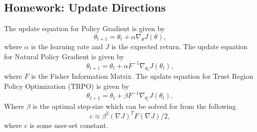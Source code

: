 \documentclass{article}
\begin{document}
\subsection{Homework: Update Directions}
The update equation for Policy Gradient is given by
\begin{equation}
	\theta_{t+1} = \theta_t + \alpha \nabla_{\theta} J(\theta),\label{eq:pg_update}
\end{equation}
where $\alpha$ is the learning rate and $J$ is the expected return. The update equation for
Natural Policy Gradient is given by
\begin{equation}
	\theta_{t+1} = \theta_t + \alpha F^{-1} \nabla_{\theta_t}J(\theta_t), \label{eq:npg_update}
\end{equation}
where $F$ is the Fisher Information Matrix.	The update equation for Trust Region Policy Optimization (TRPO) is given by
\begin{equation}
	\theta_{t+1} = \theta_t + \beta F^{-1} \nabla_{\theta_t}J(\theta_t),\label{eq:trpo_update}
\end{equation}
Where $\beta$ is the optimal step-size which can be solved for from the following
\begin{equation}
	c \approx \beta^2(\nabla J)^T F (\nabla J) / 2,
\end{equation}
where $c$ is some user-set constant.
\end{document}
